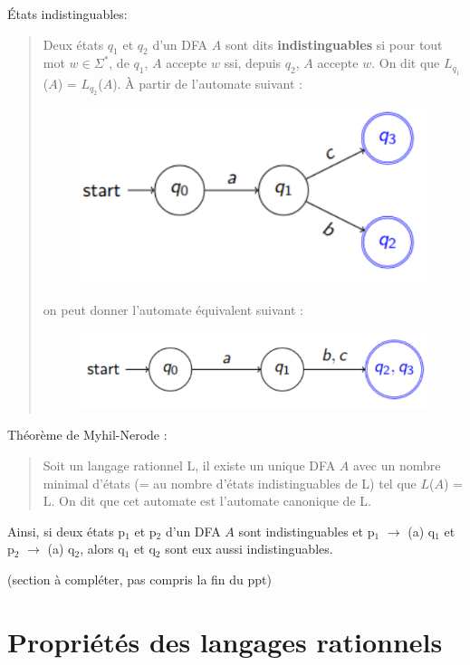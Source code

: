 \documentclass{article}
\begin{document}
États indistinguables:
\begin{quote}
    Deux états $q_{1}$ et $q_{2}$ d'un DFA $A$ sont dits \textbf{indistinguables} si pour tout mot $w \in \Sigma^{*}$, de $q_{1}$, $A$ accepte $w$ ssi, depuis $q_{2}$, $A$ accepte $w$. On dit que $L_{q_{1}}$($A$) = $L_{q_{2}}$($A$).\newpage
    À partir de l'automate suivant :
    \begin{figure}[h]
        \centering
        \includegraphics[scale=0.25]{Image15.png}
    \end{figure}
    on peut donner l'automate équivalent suivant :
    \begin{figure}[h]
        \centering
        \includegraphics[scale=0.25]{Image16.png}
    \end{figure}
\end{quote}
Théorème de Myhil-Nerode :
\begin{quote}
    Soit un langage rationnel L, il existe un unique DFA $A$ avec un nombre minimal d'états (= au nombre d'états indistinguables de L) tel que $L$($A$) = L. On dit que cet automate est l'automate canonique de L.
\end{quote}

Ainsi, si deux états p$_{1}$ et p$_{2}$ d'un DFA $A$ sont indistinguables et p$_{1}$ $\rightarrow$ (a) q$_{1}$ et p$_{2}$ $\rightarrow$ (a) q$_{2}$, alors q$_{1}$ et q$_{2}$ sont eux aussi indistinguables.

(section à compléter, pas compris la fin du ppt)

\newpage
\section{Propriétés des langages rationnels}
\end{document}
